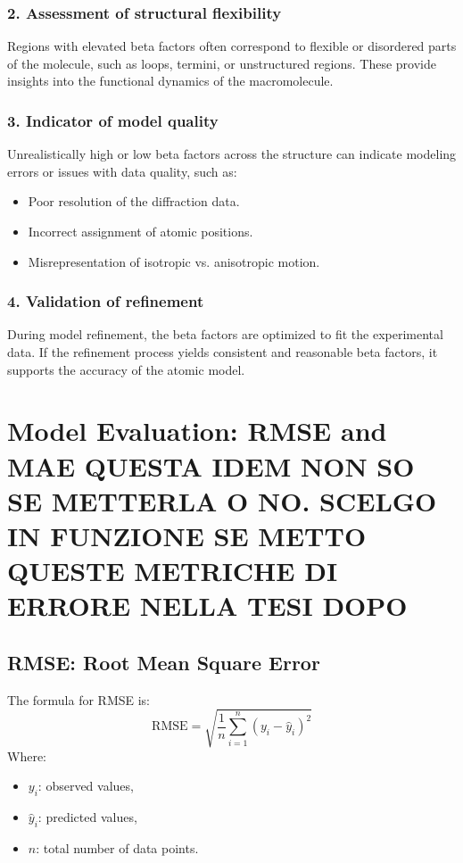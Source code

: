 \documentclass[English, Lau, oneside]{sapthesis}
\begin{document}
\subsubsection*{2. Assessment of structural flexibility}
Regions with elevated beta factors often correspond to flexible or disordered parts of the molecule, such as loops, termini, or unstructured regions. These provide insights into the functional dynamics of the macromolecule.

\subsubsection*{3. Indicator of model quality}
Unrealistically high or low beta factors across the structure can indicate modeling errors or issues with data quality, such as:
\begin{itemize}
    \item Poor resolution of the diffraction data.
    \item Incorrect assignment of atomic positions.
    \item Misrepresentation of isotropic vs. anisotropic motion.
\end{itemize}
\subsubsection*{4. Validation of refinement}
\noindent During model refinement, the beta factors are optimized to fit the experimental data. If the refinement process yields consistent and reasonable beta factors, it supports the accuracy of the atomic model.
\newpage


\section*{Model Evaluation: RMSE and MAE    {QUESTA IDEM NON SO SE METTERLA O NO. SCELGO IN FUNZIONE SE METTO QUESTE METRICHE DI ERRORE NELLA TESI DOPO}
}\label{sec:Evaluation}
\subsection*{RMSE: Root Mean Square Error}
\noindent The formula for RMSE is:
\[
\text{RMSE} = \sqrt{\frac{1}{n} \sum_{i=1}^n (y_i - \hat{y}_i)^2}
\]
Where:
\begin{itemize}
    \item \(y_i\): observed values,
    \item \(\hat{y}_i\): predicted values,
    \item \(n\): total number of data points.
\end{itemize}
\end{document}
